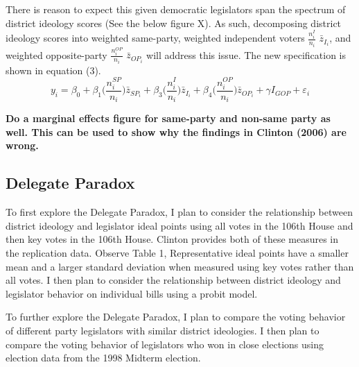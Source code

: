 \documentclass[10pt,letterpaper]{article}
\begin{document}
There is reason to expect this given democratic legislators span the spectrum of district ideology scores (See the below figure X). As such, decomposing district ideology scores into weighted same-party, weighted independent voters $\frac{n_i^{I}}{n_i}$ $\bar{z}_{I_i}$, and weighted opposite-party $\frac{n_i^{OP}}{n_i}$ $\bar{z}_{OP_i}$ will address this issue. The new specification is shown in equation (3).
\begin{equation}
y_i  = \beta_0 + \beta_1 \bigg( \frac{n_i^{SP}}{n_i} \bigg) \bar{z}_{SP_i} + \beta_3 \bigg( \frac{n_i^{I}}{n_i} \bigg) \bar{z}_{I_i} + \beta_4 \bigg( \frac{n_i^{OP}}{n_i} \bigg) \bar{z}_{OP_i} + \gamma I_{GOP} + \varepsilon_i
\end{equation}

\textbf{Do a marginal effects figure for same-party and non-same party as well. This can be used to show why the findings in Clinton (2006) are wrong.}

\newpage

\newpage

\newpage

\newpage




 

\newpage

\subsection{Delegate Paradox}


To first explore the Delegate Paradox, I plan to consider the relationship between district ideology and legislator ideal points using all votes in the 106th House and then key votes in the 106th House. Clinton provides both of these measures in the replication data. Observe Table 1, Representative ideal points have a smaller mean and a larger standard deviation when measured using key votes rather than all votes. I then plan to consider the relationship between district ideology and legislator behavior on individual bills using a probit model.

To further explore the Delegate Paradox, I plan to compare the voting behavior of different party legislators with similar district ideologies. I then plan to compare the voting behavior of legislators who won in close elections using election data from the 1998 Midterm election.
\end{document}
